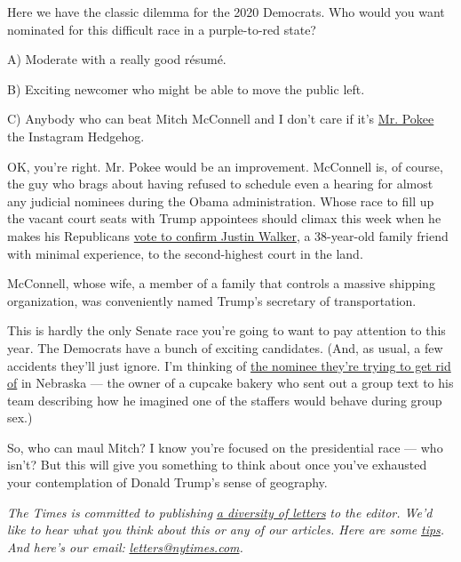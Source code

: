 Here we have the classic dilemma for the 2020 Democrats. Who would you
want nominated for this difficult race in a purple-to-red state?

A) Moderate with a really good résumé.

B) Exciting newcomer who might be able to move the public left.

C) Anybody who can beat Mitch McConnell and I don't care if it's
\href{https://www.instagram.com/mr.pokee/?hl=en}{Mr. Pokee} the
Instagram Hedgehog.

OK, you're right. Mr. Pokee would be an improvement. McConnell is, of
course, the guy who brags about having refused to schedule even a
hearing for almost any judicial nominees during the Obama
administration. Whose race to fill up the vacant court seats with Trump
appointees should climax this week when he makes his Republicans
\href{https://www.nytimes.com/2020/06/04/us/judge-justin-walker-nomination-senate.html}{vote
to confirm Justin Walker}, a 38-year-old family friend with minimal
experience, to the second-highest court in the land.

McConnell, whose wife, a member of a family that controls a massive
shipping organization, was conveniently named Trump's secretary of
transportation.

This is hardly the only Senate race you're going to want to pay
attention to this year. The Democrats have a bunch of exciting
candidates. (And, as usual, a few accidents they'll just ignore. I'm
thinking of
\href{https://www.nytimes.com/2020/06/16/us/politics/chris-janicek-nebraska-senate.html}{the
nominee they're trying to get rid of} in Nebraska --- the owner of a
cupcake bakery who sent out a group text to his team describing how he
imagined one of the staffers would behave during group sex.)

So, who can maul Mitch? I know you're focused on the presidential race
--- who isn't? But this will give you something to think about once
you've exhausted your contemplation of Donald Trump's sense of
geography.

\emph{The Times is committed to publishing}
\href{https://www.nytimes.com/2019/01/31/opinion/letters/letters-to-editor-new-york-times-women.html}{\emph{a
diversity of letters}} \emph{to the editor. We'd like to hear what you
think about this or any of our articles. Here are some}
\href{https://help.nytimes.com/hc/en-us/articles/115014925288-How-to-submit-a-letter-to-the-editor}{\emph{tips}}\emph{.
And here's our email:}
\href{mailto:letters@nytimes.com}{\emph{letters@nytimes.com}}\emph{.}

